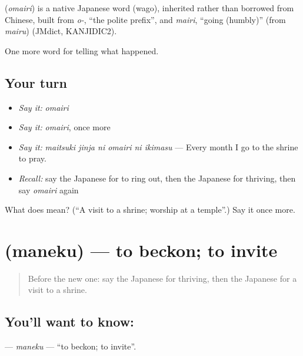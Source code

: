 \begin{cousinweb}
\textbf{} (\emph{omairi}) is a native Japanese word (wago), inherited rather than borrowed from Chinese, built from \emph{o-}, \textquotedblleft{}the polite prefix\textquotedblright{}, and \emph{mairi}, \textquotedblleft{}going (humbly)\textquotedblright{} (from \emph{mairu}) (JMdict, KANJIDIC2).
\end{cousinweb}

\begin{grammarlens}[title={What you've built}]
One more word for telling what happened.
\end{grammarlens}

\subsection*{Your turn}
\begin{itemize}
\raggedright
  \item \emph{Say it:} \emph{omairi}
  \item \emph{Say it:} \emph{omairi}, once more
  \item \emph{Say it:} \emph{maitsuki jinja ni omairi ni ikimasu} — Every month I go to the shrine to pray.
  \item \emph{Recall:} say the Japanese for to ring out, then the Japanese for thriving, then say \emph{omairi} again
\end{itemize}

\begin{tcolorbox}[breakable,colback=teal!4,colframe=teal!35!black,title={Before you move on}]
What does  mean? (\textquotedblleft{}A visit to a shrine; worship at a temple\textquotedblright{}.) Say it once more.
\end{tcolorbox}
\section[\texorpdfstring{\ja{まねく} (maneku)}{まねく (maneku)}]{ (maneku) — to beckon; to invite}

\label{lesson:JA-C296-maneku}



\begin{quote}
Before the new one: say the Japanese for thriving, then the Japanese for a visit to a shrine.
\end{quote}

\subsection*{You'll want to know: }
\textbf{} — \emph{maneku} — \textquotedblleft{}to beckon; to invite\textquotedblright{}.

